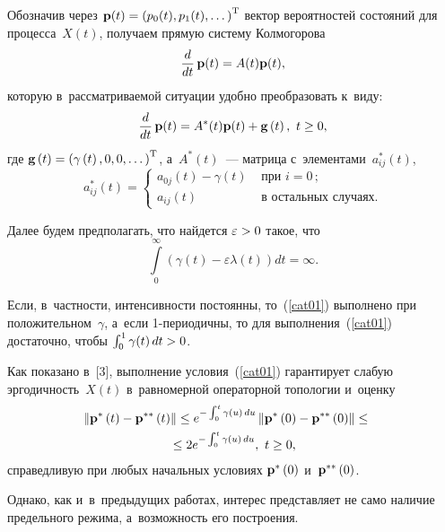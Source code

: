 \begin{multicols}{2}
Обозначив через $\mathbf{p}(t) \hm=\left(p_0(t), p_1(t),\dots\right)^{\mathrm{T}}$ 
вектор вероятностей состояний для процесса~$X(t)$, получаем прямую систему Колмогорова
$$
\displaystyle\frac{\displaystyle d\mathstrut}{\displaystyle dt\mathstrut}\,\mathbf{p}(t)=A(t)\mathbf{p}(t),
$$
которую в~рассматриваемой ситуации удобно преобразовать к~виду:
\begin{equation}
\displaystyle\frac{\displaystyle d  \mathstrut}{\displaystyle dt\mathstrut}\,{\bf p}(t)=A^*(t) {{\bf p} (t)}  +{\bf g}\left(t\right),  \ t \ge 0,
\label{s2-1}
\end{equation}
где ${\bf g}\left(t\right)\hm=\left(\gamma\left(t\right),0,0, \dots\right)^{\mathrm{T}}$, 
а~$A^*(t)$~--- матрица с~элементами~$a_{ij}^*(t)$,
\begin{equation*}
a_{ij}^*\left(t\right) =
\begin{cases}
a_{0j}\left(t\right) - \gamma\left(t\right) & \mbox { при }  i= 0\,;\\
a_{ij}\left(t\right) & \mbox { в~остальных случаях}.
\end{cases}
\end{equation*}


Далее будем предполагать, что найдется $\varepsilon \hm> 0$ такое, что
\begin{equation} 
\int\limits_0^\infty \left(\gamma(t)- \varepsilon \lambda(t)\right) dt = \infty. 
\label{cat01}
\end{equation}



Если, в~частности, интенсивности постоянны, то~(\ref{cat01}) 
выполнено при положительном~$\gamma$, а~если \mbox{1-пе}\-рио\-дич\-ны, то для выполнения~(\ref{cat01}) 
достаточно, чтобы $\int\nolimits_0^1 \gamma(t)\, dt \hm>0$.


Как показано в~[3], выполнение  условия~(\ref{cat01}) 
гарантирует слабую эргодичность~$X(t)$ в~равномерной операторной топологии и~оценку
\begin{multline}
\hspace*{-3mm}\left\|{{\bf p}}^{*}\left(t\right)-{{\bf p}}^{**}
\left(t\right)\right\|\le e^{-\int\nolimits_0^t  \gamma\left(u\right)\, du}\left\|{{\bf p}}^{*}
\left(0\right)-{{\bf p}}^{**}\left(0\right)\right\| \le{}\hspace*{-0.57915pt}\\
{}\le 2 e^{-\int\nolimits_0^t \gamma\left(u\right)\, du}, \ t \ge 0, 
\label{est01}
\end{multline}
справедливую при любых начальных условиях
${{\bf p}}^{*}\left(0\right)$ и~${{\bf p}}^{**}\left(0\right)$.


Однако, как и~в~предыдущих работах, интерес представляет не само наличие предельного режима, 
а~возможность его построения.


\end{multicols}
